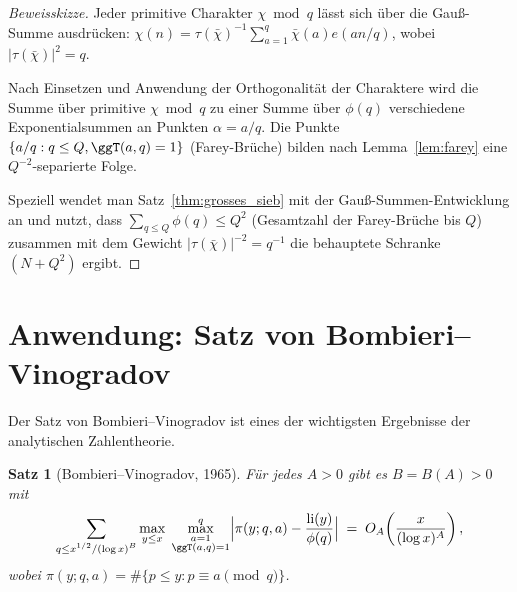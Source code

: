 \documentclass[12pt,a4paper]{amsart}
\newtheorem{theorem}{Satz}[section]
\theoremstyle{definition}
\DeclareMathOperator{\li}{li}
\newcommand{\eexp}[1]{e\!\left(#1\right)}
\begin{document}
\begin{proof}[Beweisskizze]
  Jeder primitive Charakter $\chi\bmod q$ lässt sich über die Gauß-Summe
  ausdrücken: $\chi(n) = \tau(\bar\chi)^{-1}\sum_{a=1}^{q}\bar\chi(a)
  \eexp{an/q}$, wobei $|\tau(\bar\chi)|^2 = q$.

  Nach Einsetzen und Anwendung der Orthogonalität der Charaktere wird die
  Summe über primitive $\chi\bmod q$ zu einer Summe über $\phi(q)$
  verschiedene Exponentialsummen an Punkten $\alpha = a/q$.  Die Punkte
  $\{a/q : q \leq Q, \ggT(a,q) = 1\}$ (Farey-Brüche) bilden nach
  Lemma~\ref{lem:farey} eine $Q^{-2}$-separierte Folge.

  Speziell wendet man Satz~\ref{thm:grosses_sieb} mit der Gauß-Summen-Entwicklung
  an und nutzt, dass $\sum_{q \leq Q}\phi(q) \leq Q^2$ (Gesamtzahl der
  Farey-Brüche bis $Q$) zusammen mit dem Gewicht $|\tau(\bar\chi)|^{-2} = q^{-1}$
  die behauptete Schranke $(N+Q^2)$ ergibt.  \qedhere
\end{proof}

\section{Anwendung: Satz von Bombieri--Vinogradov}

Der Satz von Bombieri--Vinogradov ist eines der wichtigsten Ergebnisse der
analytischen Zahlentheorie.

\begin{theorem}[Bombieri--Vinogradov, 1965]\label{thm:bombieri_vinogradov}
  Für jedes $A > 0$ gibt es $B = B(A) > 0$ mit
  \[
    \sum_{\substack{q \leq x^{1/2}/(\log x)^{B}}}
    \max_{y \leq x}\;\max_{\substack{a=1\\\ggT(a,q)=1}}^{q}
    \Bigl|\pi(y;q,a) - \frac{\li(y)}{\phi(q)}\Bigr|
    \;=\;
    O_A\!\left(\frac{x}{(\log x)^{A}}\right),
  \]
  wobei $\pi(y;q,a) = \#\{p \leq y : p \equiv a \pmod q\}$.
\end{theorem}
\end{document}
